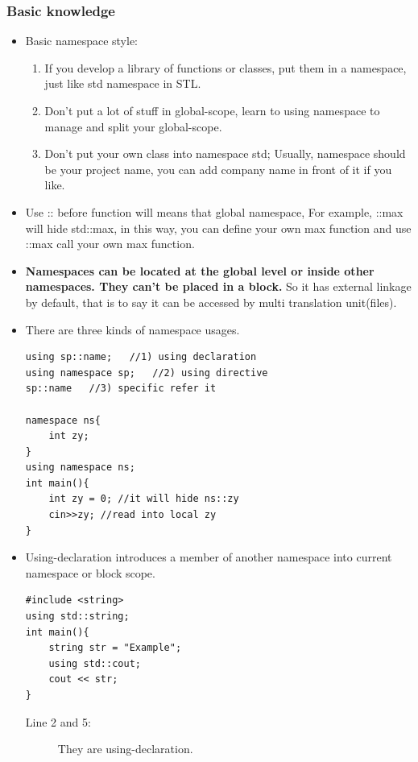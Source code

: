 \documentclass[a4paper,11pt,twoside]{book}
\begin{document}
\subsubsection{Basic knowledge}
\begin{itemize}
	\item Basic namespace style:
	\begin{enumerate}
		\item If you develop a library of functions or classes, put them in a namespace, just like std namespace in STL.
		
		\item Don't put a lot of stuff in global-scope, learn to using namespace to manage and split your global-scope. 
		
		\item Don't put your own class into namespace std; Usually, namespace should be your project name, you can add company name in front of it if you like.
	\end{enumerate}
	
	
	\item Use :: before function will means that global namespace, For example, ::max will hide std::max, in this way, you can define your own max function and use ::max call your own max function. 
	

	\item \textbf{Namespaces can be located at the global level or inside other namespaces. They can't be placed in a block.} So it has external linkage by default, that is to say it can be accessed by multi translation unit(files).


	\item There are three kinds of namespace usages.
\begin{lstlisting}[numbers = none]
using sp::name;   //1) using declaration
using namespace sp;   //2) using directive
sp::name   //3) specific refer it
	
namespace ns{
	int zy;
}
using namespace ns;
int main(){
	int zy = 0; //it will hide ns::zy
	cin>>zy; //read into local zy
}
\end{lstlisting}
	
	\item Using-declaration introduces a member of another namespace into current namespace or block scope.
	
\begin{lstlisting}[numbers=none]
#include <string>
using std::string;
int main(){
	string str = "Example";
	using std::cout;
	cout << str;
}
\end{lstlisting}
\begin{description}
	\item[Line 2 and 5:] They are using-declaration.
\end{description}
	

\end{itemize}
\end{document}
